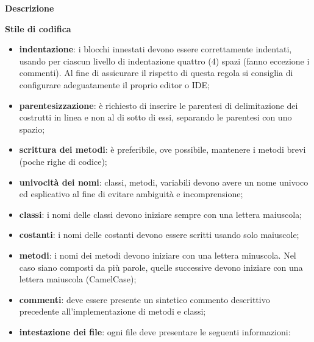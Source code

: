 \begin{itemize}
			\noindent\textbf{Descrizione} \mbox{}\\
			
			 \newline 
			
			\noindent\textbf{Stile di codifica} \mbox{}\\
			
				\begin{itemize}
					\item \textbf{indentazione}: i blocchi innestati devono essere correttamente 
						indentati, usando per ciascun livello di indentazione quattro (4) spazi (fanno 
						eccezione i commenti). Al fine di assicurare il rispetto di questa regola si 
						consiglia di configurare adeguatamente il proprio editor o IDE;
					\item \textbf{parentesizzazione}: è richiesto di inserire 
					le parentesi di delimitazione dei costrutti in linea e non 
					al di sotto di essi, separando le parentesi con uno spazio;
					\item \textbf{scrittura dei metodi}: è preferibile, ove possibile, 
						mantenere i metodi brevi (poche righe di codice);
					\item \textbf{univocità dei nomi}: classi, metodi, variabili devono avere un 
						nome univoco	ed esplicativo al fine di evitare ambiguità e incomprensione;
					\item \textbf{classi}: i nomi delle classi devono iniziare sempre con una 
						lettera maiuscola;		
					\item \textbf{costanti}: i nomi delle costanti devono essere scritti usando 
						solo maiuscole;
					\item \textbf{metodi}: i nomi dei metodi devono iniziare con una lettera 
						minuscola. Nel caso siano composti da più parole, quelle successive devono iniziare con una 
						lettera maiuscola (CamelCase\glo{});
					\item \textbf{commenti}: deve essere presente un sintetico commento descrittivo precedente all'implementazione di metodi e classi;
					\item \textbf{intestazione dei file}: ogni file deve presentare le seguenti informazioni:

\end{itemize}
\end{itemize}

